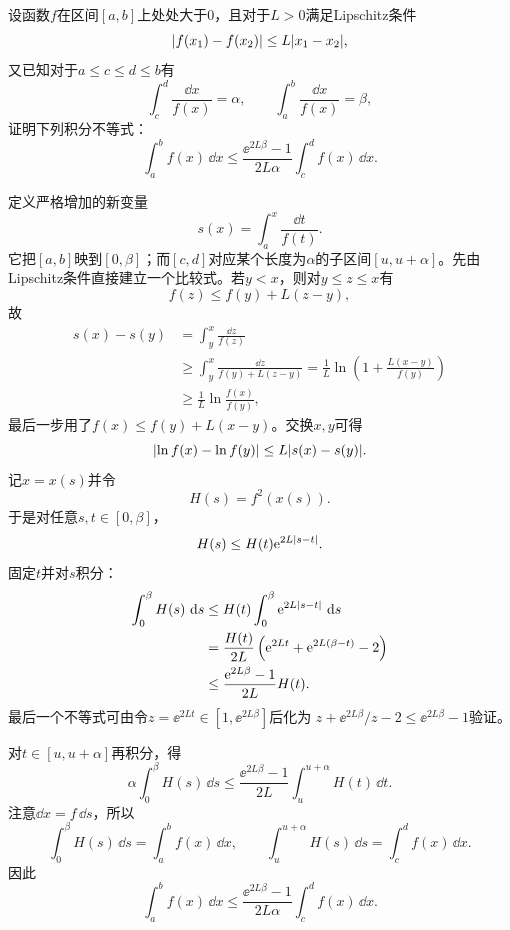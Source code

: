 \begin{xreferenceproblem}[14]
设函数$f$在区间$[a,b]$上处处大于0，且对于$L>0$满足Lipschitz条件
  \[
    \lvert f(x_1)-f(x_2)\rvert\le L\lvert x_1-x_2\rvert,
  \]
  又已知对于$a\le c\le d\le b$有
  \[
    \int_c^d\frac{\dd x}{f(x)}=\alpha,
    \qquad
    \int_a^b\frac{\dd x}{f(x)}=\beta,
  \]
  证明下列积分不等式：
  \[
    \int_a^bf(x)\,\dd x
    \le\frac{\ee^{2L\beta}-1}{2L\alpha}\int_c^df(x)\,\dd x.
  \]
\end{xreferenceproblem}
\begin{xsolution}
定义严格增加的新变量
\[
 s(x)=\int_a^x\frac{\dd t}{f(t)}.
\]
它把$[a,b]$映到$[0,\beta]$；而$[c,d]$对应某个长度为$\alpha$的子区间$[u,u+\alpha]$。先由Lipschitz条件直接建立一个比较式。若$y<x$，则对$y\le z\le x$有
\[
 f(z)\le f(y)+L(z-y),
\]
故
\begin{align*}
 s(x)-s(y)
 &=\int_y^x\frac{\dd z}{f(z)}\\
 &\ge\int_y^x\frac{\dd z}{f(y)+L(z-y)}
 =\frac1L\ln\left(1+\frac{L(x-y)}{f(y)}\right)\\
 &\ge\frac1L\ln\frac{f(x)}{f(y)},
\end{align*}
最后一步用了$f(x)\le f(y)+L(x-y)$。交换$x,y$可得
\[
 \lvert\ln f(x)-\ln f(y)\rvert\le L\lvert s(x)-s(y)\rvert.
\]
记$x=x(s)$并令
\[
 H(s)=f^2(x(s)).
\]
于是对任意$s,t\in[0,\beta]$，
\[
 H(s)\le H(t)\mathrm{e}^{2L\lvert s-t\rvert}.
\]
固定$t$并对$s$积分：
\begin{align*}
\int_0^\beta H(s)\,\mathop{}\!\mathrm{d} s
&\le H(t)\int_0^\beta\mathrm{e}^{2L\lvert s-t\rvert}\,\mathop{}\!\mathrm{d} s\\
&=\frac{H(t)}{2L}\left(
 \mathrm{e}^{2Lt}+\mathrm{e}^{2L(\beta-t)}-2
\right)\\
&\le\frac{\mathrm{e}^{2L\beta}-1}{2L}H(t).
\end{align*}
最后一个不等式可由令$z=\ee^{2Lt}\in[1,\ee^{2L\beta}]$后化为
$z+\ee^{2L\beta}/z-2\le\ee^{2L\beta}-1$验证。

对$t\in[u,u+\alpha]$再积分，得
\[
 \alpha\int_0^\beta H(s)\,\dd s
 \le\frac{\ee^{2L\beta}-1}{2L}
 \int_u^{u+\alpha}H(t)\,\dd t.
\]
注意$\dd x=f\,\dd s$，所以
\[
 \int_0^\beta H(s)\,\dd s=\int_a^bf(x)\,\dd x,
 \qquad
 \int_u^{u+\alpha}H(s)\,\dd s=\int_c^df(x)\,\dd x.
\]
因此
\[
 \boxed{
 \int_a^bf(x)\,\dd x
 \le\frac{\ee^{2L\beta}-1}{2L\alpha}
 \int_c^df(x)\,\dd x}.
\]
\end{xsolution}


